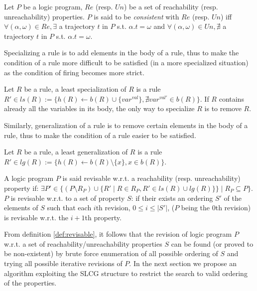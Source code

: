 \begin{definition}
Let $P$ be a logic program, $Re$ (resp. $Un$) be a set of reachability (resp. unreachability) properties.
$P$ is said to be {\em consistent} with $Re$ (resp. $Un$) iff
$\forall (\alpha,\omega) \in Re, \exists$ a trajectory $t$ in $P$ s.t. $\alpha.t=\omega$ and 
$\forall (\alpha,\omega) \in Un, \nexists$ a trajectory $t$ in $P$ s.t. $\alpha.t=\omega$.
\end{definition}

Specializing a rule is to add elements in the body of a rule,
thus to make the condition of a rule more difficult to be satisfied (in a more specialized situation) as the condition of firing becomes more strict.

\begin{definition}
	Let $R$ be a rule, a least specialization of $R$ is a rule $R' \in ls(R) := \{h(R) \leftarrow b(R) \cup \{var^{val}\}, \nexists var^{val'} \in b(R)\}$.
	If $R$ contains already all the variables in its body, the only way to specialize $R$ is to remove $R$.
\end{definition}

    Similarly, generalization of a rule is to remove certain elements in the body of a rule, thus to make the condition of a rule easier to be satisfied.

\begin{definition}
	Let $R$ be a rule, a least generalization of $R$ is a rule $R' \in lg(R) := \{h(R) \leftarrow b(R) \setminus \{x\},  x \in b(R)\}$.
\end{definition}

\begin{definition}[Revisable]\label{def:revisable}
	A logic program $P$ is said revisable w.r.t. a reachability (resp. unreachability) property if:
	$\exists P' \in \{(P \setminus R_P) \cup \{R' \mid R \in R_P, R' \in ls(R) \cup lg(R)\} \} \mid R_P \subseteq P\}$.
	$P$ is revisable w.r.t. to a set of property $S$:
	if their exists an ordering $S'$ of the elements of $S$ such that each $i$th revision, $0 \leq i \leq |S'|$, ($P$ being the $0$th revision) is revisable w.r.t. the $i+1$th property.
\end{definition} 

From definition \ref{def:revisable}, it follows that the revision of logic program $P$ w.r.t. a set of reachability/unreachability properties $S$ can be found (or proved to be non-existent) by brute force enumeration of all possible ordering of $S$ and trying all possible iterative revisions of $P$.
In the next section we propose an algorithm exploiting the SLCG structure to restrict the search to valid ordering of the properties.
